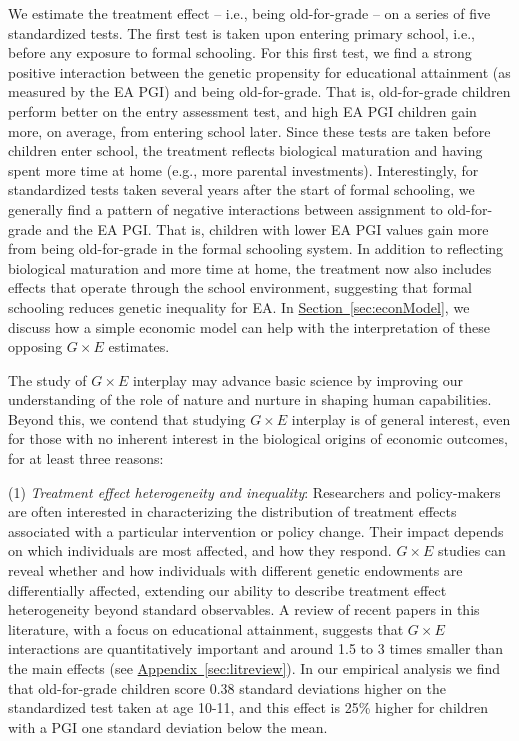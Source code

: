 \documentclass[12pt,a4paper]{article}
\begin{document}
\begin{bibunit}
We estimate the treatment effect -- i.e., being old-for-grade -- on a series of five standardized tests.  The first test is taken upon entering primary school, i.e., before any exposure to formal schooling.  For this first test, we find a strong positive interaction between the genetic propensity for educational attainment (as measured by the EA PGI) and being old-for-grade. That is, old-for-grade children perform better on the entry assessment test, and high EA PGI children gain more, on average, from entering school later. Since these tests are taken before children enter school, the treatment reflects biological maturation and having spent more time at home (e.g., more parental investments). Interestingly, for standardized tests taken several years after the start of formal schooling, we generally find a pattern of negative interactions between assignment to old-for-grade and the EA PGI.  That is, children with lower EA PGI values gain more from being old-for-grade in the formal schooling system. In addition to reflecting biological maturation and more time at home, the treatment now also includes effects that operate through the school environment, suggesting that formal schooling reduces genetic inequality for EA. In \hyperref[sec:econModel]{Section~\ref*{sec:econModel}}, we discuss how a simple economic model can help with the interpretation of these opposing $G \times E$ estimates.

The study of $G \times E$ interplay may advance basic science by improving our understanding of the role of nature and nurture in shaping human capabilities. Beyond this, we contend that studying $G \times E$ interplay is of general interest, even for those with no inherent interest in the biological origins of economic outcomes, for at least three reasons:

(1) \textit{Treatment effect heterogeneity and inequality}:  Researchers and policy-makers are often interested in characterizing the distribution of treatment effects associated with a particular intervention or policy change.  Their impact depends on which individuals are most affected, and how they respond.  $G \times E$ studies can reveal whether and how individuals with different genetic endowments are differentially affected, extending our ability to describe treatment effect heterogeneity beyond standard observables. A review of recent papers in this literature, with a focus on educational attainment, suggests that $G \times E$ interactions are quantitatively important and around 1.5 to 3 times smaller than the main effects (see  \hyperref[sec:litreview]{Appendix~\ref*{sec:litreview}}). In our empirical analysis we find that old-for-grade children score 0.38 standard deviations higher on the standardized test taken at age 10-11, and this effect is 25\% higher for children with a PGI one standard deviation below the mean. 


\end{bibunit}
\end{document}
